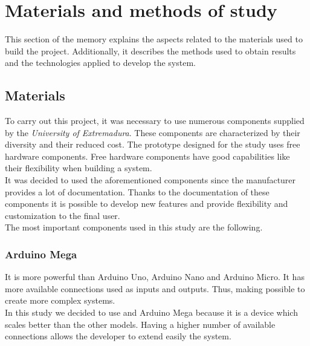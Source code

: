 
\chapter{Materials and methods of study}

This section of the memory explains the aspects related to the materials used to build the project. Additionally, it describes the methods used to obtain results and the technologies applied to develop the system.

\section{Materials}

To carry out this project, it was necessary to use numerous components supplied by the \textit{University of Extremadura}. These components are characterized by their diversity and their reduced cost. The prototype designed for the study uses free hardware components. Free hardware components have good capabilities like their flexibility when building a system.\\

It was decided to used the aforementioned components since the manufacturer provides a lot of documentation. Thanks to the documentation of these components it is possible to develop new features and provide flexibility and customization to the final user.\\

The most important components used in this study are the following.

\subsection{Arduino Mega}

It is more powerful than Arduino Uno, Arduino Nano and Arduino Micro. It has more available connections used as inputs and outputs. Thus, making possible to create more complex systems.\\

In this study we decided to use and Arduino Mega because it is a device which scales better than the other models. Having a higher number of available connections allows the developer to extend easily the system.\\


